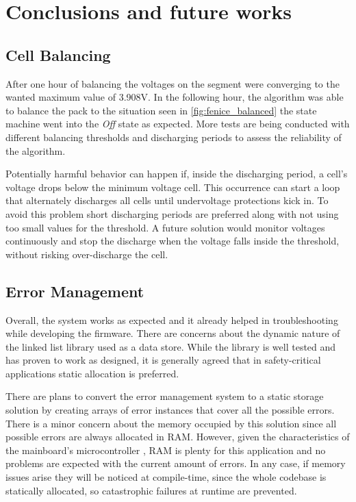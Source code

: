 \chapter{Conclusions and future works}

\section{Cell Balancing}

After one hour of balancing the voltages on the segment were converging to the wanted maximum value of 3.908V. In the following hour, the algorithm was able to balance the pack to the situation seen in \autoref{fig:fenice_balanced} the state machine went into the \textit{Off} state as expected. More tests are being conducted with different balancing thresholds and discharging periods to assess the reliability of the algorithm.

Potentially harmful behavior can happen if, inside the discharging period, a cell's voltage drops below the minimum voltage cell. This occurrence can start a loop that alternately discharges all cells until undervoltage protections kick in. To avoid this problem short discharging periods are preferred along with not using too small values for the threshold. A future solution would monitor voltages continuously and stop the discharge when the voltage falls inside the threshold, without risking over-discharge the cell.

\section{Error Management}
Overall, the system works as expected and it already helped in troubleshooting while developing the firmware. There are concerns about the dynamic nature of the linked list library used as a data store. While the library is well tested and has proven to work as designed, it is generally agreed that in safety-critical applications static allocation is preferred.

There are plans to convert the error management system to a static storage solution by creating arrays of error instances that cover all the possible errors. There is a minor concern about the memory occupied by this solution since all possible errors are always allocated in RAM. However, given the characteristics of the mainboard's microcontroller \cite{f446re}, RAM is plenty for this application and no problems are expected with the current amount of errors. In any case, if memory issues arise they will be noticed at compile-time, since the whole codebase is statically allocated, so catastrophic failures at runtime are prevented.


